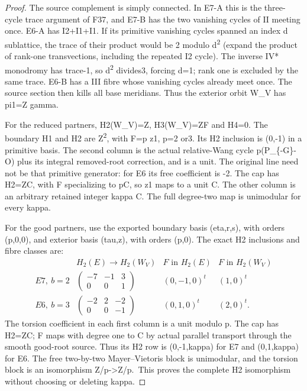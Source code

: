 \begin{proof}
The source complement is simply connected. In E7-A this is the
three-cycle trace argument of F37, and E7-B has the two vanishing
cycles of II meeting once. E6-A has I2+I1+I1. If its primitive
vanishing cycles spanned an index d sublattice, the trace of their
product would be 2 modulo d\textsuperscript{2} (expand the product of rank-one
transvections, including the repeated I2 cycle). The inverse IV*
monodromy has trace-1, so d\textsuperscript{2} divides3, forcing d=1; rank one is
excluded by the same trace. E6-B has a III fibre whose vanishing
cycles already meet once. The source section then kills all base
meridians. Thus the exterior orbit W\_V has pi1=Z gamma.

For the reduced partners, H2(W\_V)=Z, H3(W\_V)=ZF and H4=0.
The boundary H1 and H2 are Z\textsuperscript{2}, with F=p z1, p=2 or3.
Its H2 inclusion is (0,-1) in a primitive basis. The second
column is the actual relative-Wang cycle
p(P\_\{-G\}-O) plus its integral removed-root correction, and is
a unit. The original line need not be that primitive generator:
for E6 its free coefficient is -2. The cap has H2=ZC, with
F specializing to pC, so z1 maps to a unit C. The other column
is an arbitrary retained integer kappa C. The full degree-two
map is unimodular for every kappa.

For the good partners, use the exported boundary basis
(eta,r,s), with orders (p,0,0), and exterior basis (tau,z), with
orders (p,0). The exact H2 inclusions and fibre classes are:
\[
\begin{array}{c|c|c|c}
 & H_2(E)\longrightarrow H_2(W_V)&F\text{ in }H_2(E)&F\text{ in }H_2(W_V)\\
E7,\ b=2&
\begin{pmatrix}-7&-1&3\\0&0&1\end{pmatrix}&(0,-1,0)^t&(1,0)^t\\
E6,\ b=3&
\begin{pmatrix}-2&2&-2\\0&0&-1\end{pmatrix}&(0,1,0)^t&(2,0)^t .
\end{array}                                                     \tag{SC.3}
\]
The torsion coefficient in each first column is a unit modulo p.
The cap has H2=ZC; F maps with degree one to C by actual parallel
transport through the smooth good-root source. Thus its H2 row
is (0,-1,kappa) for E7 and (0,1,kappa) for E6. The free two-by-two
Mayer--Vietoris block is unimodular, and the torsion block is an
isomorphism Z/p-\textgreater Z/p.~This proves the complete H2 isomorphism
without choosing or deleting kappa.


\end{proof}
